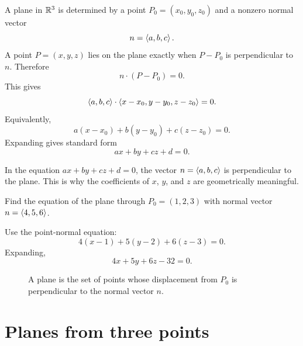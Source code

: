 A plane in $\mathbb{R}^3$ is determined by a point $P_0=(x_0,y_0,z_0)$ and a nonzero normal vector
\[
  n=\left\langle a,b,c\right\rangle.
\]
A point $P=(x,y,z)$ lies on the plane exactly when $P-P_0$ is perpendicular to $n$. Therefore
\[
  n\cdot(P-P_0)=0.
\]
This gives
\[
  \left\langle a,b,c\right\rangle\cdot\left\langle x-x_0,y-y_0,z-z_0\right\rangle=0.
\]
Equivalently,
\[
  a(x-x_0)+b(y-y_0)+c(z-z_0)=0.
\]
Expanding gives standard form
\[
  ax+by+cz+d=0.
\]

\begin{notebox}
In the equation $ax+by+cz+d=0$, the vector $n=\left\langle a,b,c\right\rangle$ is perpendicular to the plane. This is why the coefficients of $x$, $y$, and $z$ are geometrically meaningful.
\end{notebox}

\begin{examplebox}[title={Example 4.4: Equation of a plane from point and normal vector}]
Find the equation of the plane through $P_0=(1,2,3)$ with normal vector $n=\left\langle 4,5,6\right\rangle$.

Use the point-normal equation:
\[
  4(x-1)+5(y-2)+6(z-3)=0.
\]
Expanding,
\[
  4x+5y+6z-32=0.
\]
\end{examplebox}

\begin{figure}[H]
\centering
{}
\caption{A plane is the set of points whose displacement from $P_0$ is perpendicular to the normal vector $n$.}
\end{figure}

\section{Planes from three points}

